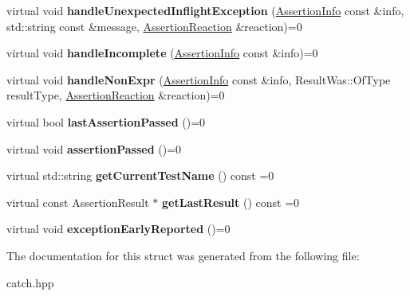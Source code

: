 \begin{DoxyCompactItemize}
\item 
\mbox{\label{struct_catch_1_1_i_result_capture_afc97bc69829185222f955ebeef97adfe}} 
virtual void {\bfseries handle\+Unexpected\+Inflight\+Exception} (\mbox{\hyperlink{struct_catch_1_1_assertion_info}{Assertion\+Info}} const \&info, std\+::string const \&message, \mbox{\hyperlink{struct_catch_1_1_assertion_reaction}{Assertion\+Reaction}} \&reaction)=0
\item 
\mbox{\label{struct_catch_1_1_i_result_capture_a89b89372eb09cc44f8dcad363de6157d}} 
virtual void {\bfseries handle\+Incomplete} (\mbox{\hyperlink{struct_catch_1_1_assertion_info}{Assertion\+Info}} const \&info)=0
\item 
\mbox{\label{struct_catch_1_1_i_result_capture_ab7dbdf8aa28427119583e24dbb302c63}} 
virtual void {\bfseries handle\+Non\+Expr} (\mbox{\hyperlink{struct_catch_1_1_assertion_info}{Assertion\+Info}} const \&info, Result\+Was\+::\+Of\+Type result\+Type, \mbox{\hyperlink{struct_catch_1_1_assertion_reaction}{Assertion\+Reaction}} \&reaction)=0
\item 
\mbox{\label{struct_catch_1_1_i_result_capture_a973435fbdcb2f6f07a0ec5719a01e956}} 
virtual bool {\bfseries last\+Assertion\+Passed} ()=0
\item 
\mbox{\label{struct_catch_1_1_i_result_capture_a9b0ef2cb071e9a9dc6ec1b533026aea7}} 
virtual void {\bfseries assertion\+Passed} ()=0
\item 
\mbox{\label{struct_catch_1_1_i_result_capture_aea1617f4a84cc648246aa3ed6918b5bf}} 
virtual std\+::string {\bfseries get\+Current\+Test\+Name} () const =0
\item 
\mbox{\label{struct_catch_1_1_i_result_capture_ab18872c89fab97405a56e9c6a4919736}} 
virtual const Assertion\+Result $\ast$ {\bfseries get\+Last\+Result} () const =0
\item 
\mbox{\label{struct_catch_1_1_i_result_capture_ae63ecec95db4c236c63ecf616f483810}} 
virtual void {\bfseries exception\+Early\+Reported} ()=0
\end{DoxyCompactItemize}


The documentation for this struct was generated from the following file\+:\begin{DoxyCompactItemize}
\item 
catch.\+hpp\end{DoxyCompactItemize}

